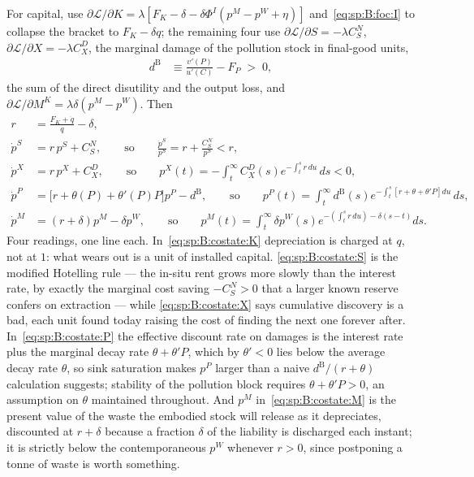 For capital, use $\partial\mathcal L/\partial K=\lambda\left[F_K-\delta-\delta\Phi^I
\left(p^M-p^W+\eta\right)\right]$ and~\eqref{eq:sp:B:foc:I} to collapse the bracket to
$F_K-\delta q$; the remaining four use $\partial\mathcal L/\partial S=-\lambda C^N_S$,
$\partial\mathcal L/\partial X=-\lambda C^D_X$, the marginal damage of the pollution stock in
final-good units,
\begin{align}
d^{\mathrm B} &\equiv \frac{v'\!\left(P\right)}{u'\!\left(C\right)}-F_P\;>\;0,
\label{eq:sp:B:damage}
\end{align}
the sum of the direct disutility and the output loss, and
$\partial\mathcal L/\partial M^K=\lambda\delta\left(p^M-p^W\right)$. Then
\begin{align}
r &= \frac{F_K+\dot q}{q}-\delta,
\label{eq:sp:B:costate:K}
\\[0.15em]
\dot p^S &= r\,p^S+C^N_S,
\qquad\text{so}\qquad
\frac{\dot p^S}{p^S} = r+\frac{C^N_S}{p^S}<r,
\label{eq:sp:B:costate:S}
\\[0.15em]
\dot p^X &= r\,p^X+C^D_X,
\qquad\text{so}\qquad
p^X\left(t\right) = -\int_t^\infty C^D_X\!\left(s\right)e^{-\int_t^s r\,du}\,ds<0,
\label{eq:sp:B:costate:X}
\\[0.15em]
\dot p^P &= \Big[r+\theta\!\left(P\right)+\theta'\!\left(P\right)P\Big]p^P-d^{\mathrm B},
\qquad\text{so}\qquad
p^P\left(t\right)=\int_t^\infty d^{\mathrm B}\left(s\right)
e^{-\int_t^s\left[r+\theta+\theta'P\right]du}\,ds,
\label{eq:sp:B:costate:P}
\\[0.15em]
\dot p^M &= \left(r+\delta\right)p^M-\delta p^W,
\qquad\text{so}\qquad
p^M\left(t\right)=\int_t^\infty \delta p^W\!\left(s\right)
e^{-\left(\int_t^s r\,du\right)-\delta\left(s-t\right)}ds .
\label{eq:sp:B:costate:M}
\end{align}
Four readings, one line each. In~\eqref{eq:sp:B:costate:K} depreciation is charged at $q$, not at $1$:
what wears out is a unit of installed capital. \eqref{eq:sp:B:costate:S} is the modified Hotelling
rule --- the in-situ rent grows more slowly than the interest rate, by exactly the marginal cost
saving $-C^N_S>0$ that a larger known reserve confers on extraction --- while
\eqref{eq:sp:B:costate:X} says cumulative discovery is a bad, each unit found today raising the cost
of finding the next one forever after. In~\eqref{eq:sp:B:costate:P} the effective discount rate on
damages is the interest rate plus the marginal decay rate $\theta+\theta'P$, which by $\theta'<0$ lies
below the average decay rate $\theta$, so sink saturation makes $p^P$ larger than a naive
$d^{\mathrm B}/\left(r+\theta\right)$ calculation suggests; stability of the pollution block requires
$\theta+\theta'P>0$, an assumption on $\theta$ maintained throughout. And $p^M$
in~\eqref{eq:sp:B:costate:M} is the present value of the waste the embodied stock will release as it
depreciates, discounted at $r+\delta$ because a fraction $\delta$ of the liability is discharged each
instant; it is strictly below the contemporaneous $p^W$ whenever $r>0$, since postponing a tonne of
waste is worth something.

